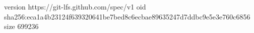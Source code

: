 version https://git-lfs.github.com/spec/v1
oid sha256:eca1a4b23124f639320641be7bed8c6ecbae89635247d7ddbc9e5e3e760c6856
size 699236
